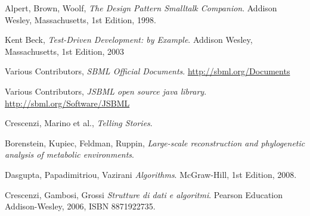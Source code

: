 \begin{thebibliography}{99}

  Alpert, Brown, Woolf,
  \emph{The Design Pattern Smalltalk Companion}.
  Addison Wesley, Massachusetts,
  1st Edition,
  1998.

  Kent Beck,
  \emph{Test-Driven Development: by Example}.
  Addison Wesley, Massachusetts,
  1st Edition,
  2003

  Various Contributors,
  \emph{SBML Official Documents}.
  \url{http://sbml.org/Documents}

 Various Contributors, \emph{JSBML open
    source java library}. \url{http://sbml.org/Software/JSBML}

  Crescenzi, Marino et al.,
  \emph{Telling Stories}.

 Borenstein, Kupiec, Feldman,
  Ruppin, \emph{Large-scale reconstruction and phylogenetic analysis
    of metabolic environments}.

  Dasgupta, Papadimitriou, Vazirani
  \emph{Algorithms}.
  McGraw-Hill,
  1st Edition,
  2008.

  Crescenzi, Gambosi, Grossi
  \emph{Strutture di dati e algoritmi}.
  Pearson Education Addison-Wesley, 2006, ISBN 8871922735.

\end{thebibliography}